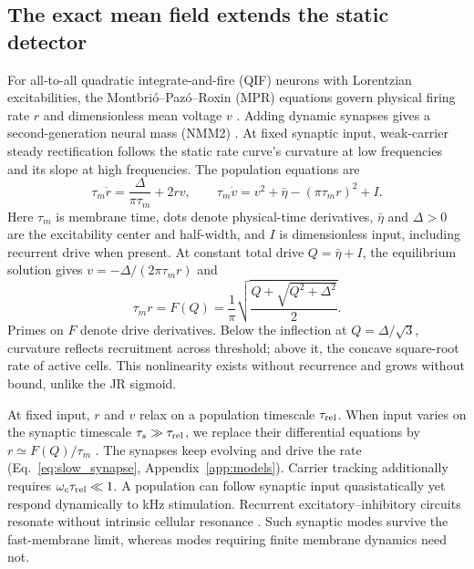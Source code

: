 \documentclass[a4paper]{article}
\begin{document}
\subsection{The exact mean field extends the static detector}\label{sec:dynamic}
For all-to-all quadratic integrate-and-fire (QIF) neurons with Lorentzian
excitabilities, the Montbri\'o--Paz\'o--Roxin (MPR) equations govern physical
firing rate $r$ and dimensionless mean voltage $v$ \cite{montbrio2015}.
Adding dynamic synapses gives a second-generation neural mass (NMM2)
\cite{ruffini2021nmm2,clusella2023}. At fixed synaptic input, weak-carrier
steady rectification follows the static rate curve's curvature at low frequencies
and its slope at high frequencies. The population equations are
\begin{equation}
\tau_m\dot r=\frac{\Delta}{\pi\tau_m}+2rv,\qquad
\tau_m\dot v=v^2+\bar\eta-(\pi\tau_m r)^2+I.
\label{eq:mpr}
\end{equation}
Here $\tau_m$ is membrane time, dots denote physical-time derivatives,
$\bar\eta$ and $\Delta>0$ are the excitability center and half-width, and
$I$ is dimensionless input, including recurrent drive when present.
At constant total drive $Q=\bar\eta+I$, the equilibrium solution \cite{ruffini2021nmm2}
gives $v=-\Delta/(2\pi\tau_m r)$ and
\begin{equation}
\tau_m r=F(Q)=\frac{1}{\pi}\sqrt{\frac{Q+\sqrt{Q^2+\Delta^2}}{2}}.
\label{eq:Fmpr}
\end{equation}
Primes on $F$ denote drive derivatives. Below the inflection at
$Q=\Delta/\sqrt3$, curvature reflects recruitment across threshold;
above it, the concave square-root rate of active cells. This nonlinearity
exists without recurrence and grows without bound, unlike the JR sigmoid.

At fixed input, $r$ and $v$ relax on a population timescale $\tau_{\rm rel}$.
When input varies on the synaptic timescale $\tau_s\gg\tau_{\rm rel}$,
we replace their differential equations by $r\simeq F(Q)/\tau_m$
\cite{ruffini2021nmm2,clusella2023}. The synapses keep evolving and
drive the rate (Eq.~\eqref{eq:slow_synapse}, Appendix~\ref{app:models}).
Carrier tracking additionally requires $\omega_c\tau_{\rm rel}\ll1$. A population can follow synaptic input quasistatically
yet respond dynamically to kHz stimulation.
Recurrent excitatory--inhibitory circuits resonate without intrinsic
cellular resonance \cite{brunelhakim1999,brunelwang2003}. Such synaptic
modes survive the fast-membrane limit, whereas modes requiring finite
membrane dynamics need not.
\end{document}
